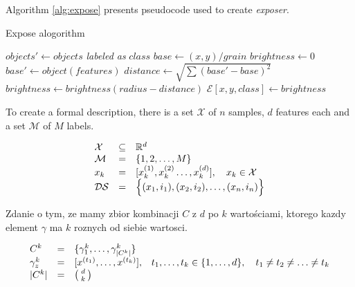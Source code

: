 \documentclass[]{article}
\begin{document}
Algorithm \ref{alg:expose} presents pseudocode used to create \emph{exposer}.

\begin{algorithm}[ht]
\caption{Expose alogorithm}
\label{alg:expose}
\begin{algorithmic}[1]
	\State 
		\State $objects' \gets objects$ \emph{labeled as} $class$
				\State $base \gets (x,y) / grain$
				\State $brightness \gets 0$	
					\State $base' \gets object(features)$
					\State $distance \gets \sqrt{\sum{(base' -  base)^2}}$
						\State $brightness \gets brightness (radius - distance)$
					\EndIf
				\EndFor
				\State $\mathcal{E}[x,y,class] \gets brightness$
			\EndFor
		\EndFor
	\EndFor
\EndProcedure
\end{algorithmic}
\end{algorithm}

To create a formal description, there is a set $\mathcal{X}$ of $n$ samples, $d$ features each and a set $\mathcal{M}$ of $M$ labels.

\begin{equation}
	\begin{array}[b]{llll}
		\mathcal{X} & \subseteq & \mathbb{R}^d\\
		\mathcal{M}&=&\{1, 2, \ldots, M\}\\
		x_k & = & [x_k^{(1)}, x_k^{(2)}\ldots, x_k^{(d)}],\quad x_k \in \mathcal{X}\\
		\mathcal{DS} & = & \Big\{(x_1,i_1),(x_2,i_2),\ldots,(x_n,i_n)\Big\}
	\end{array}
\end{equation}

Zdanie o tym, ze mamy zbior kombinacji $C$ z $d$ po $k$ wartościami, ktorego kazdy element $\gamma$ ma $k$ roznych od siebie wartosci.

\begin{equation}
	\begin{array}[b]{llll}
		C^k & = & \{\gamma_1^k, \ldots, \gamma_{|C^k|}^k \}\\
		\gamma_z^k & = & [x^{(t_1)}, \ldots, x^{(t_k)}], & t_1, \ldots, t_k \in \{1, \ldots, d\},\quad t_1\neq t_2 \neq \ldots \neq t_k\\
		|C^k| & = & {\;d\;\choose \;k\;}
	\end{array}
\end{equation}
\end{document}
